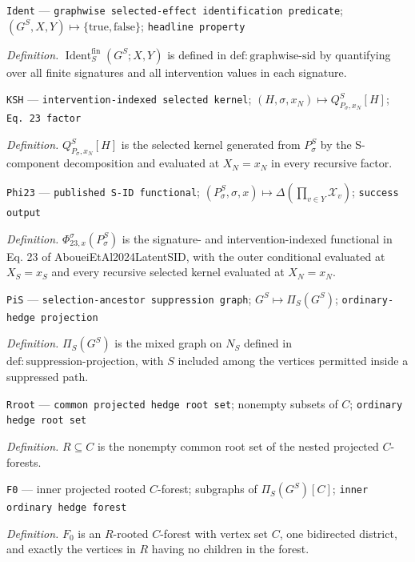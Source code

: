 \documentclass{article}
\begin{document}
\begin{itemize}
{  \item \texttt{Ident} --- \texttt{graphwise selected-\allowbreak{}effect identification predicate}; \((G^S,X,Y)\mapsto\{\mathrm{true},\mathrm{false}\}\); \texttt{headline property}
  \par\smallskip\noindent\emph{Definition.} \(\operatorname{Ident}^{\mathrm{fin}}_S(G^S;X,Y)\) is defined in \(\mathrm{def:graphwise\text{-}sid}\) by quantifying over all finite signatures and all intervention values in each signature.
  \item \texttt{KSH} --- \texttt{intervention-\allowbreak{}indexed selected kernel}; \((H,\sigma,x_N)\mapsto Q_{P_\sigma,x_N}^S[H]\); \texttt{Eq. 23 factor}
  \par\smallskip\noindent\emph{Definition.} \(Q_{P_\sigma,x_N}^S[H]\) is the selected kernel generated from \(P_\sigma^S\) by the S-component decomposition and evaluated at \(X_N=x_N\) in every recursive factor.
  \item \texttt{Phi23} --- \texttt{published S-\allowbreak{}ID functional}; \((P_\sigma^S,\sigma,x)\mapsto\Delta(\prod_{v\in Y}\mathcal X_v)\); \texttt{success output}
  \par\smallskip\noindent\emph{Definition.} \(\Phi_{23,x}^{\sigma}(P_\sigma^S)\) is the signature- and intervention-indexed functional in Eq. 23 of AboueiEtAl2024LatentSID, with the outer conditional evaluated at \(X_S=x_S\) and every recursive selected kernel evaluated at \(X_N=x_N\).
  \item \texttt{PiS} --- \texttt{selection-\allowbreak{}ancestor suppression graph}; \(G^S\mapsto\Pi_S(G^S)\); \texttt{ordinary-\allowbreak{}hedge projection}
  \par\smallskip\noindent\emph{Definition.} \(\Pi_S(G^S)\) is the mixed graph on \(N_S\) defined in \(\mathrm{def:suppression\text{-}projection}\), with \(S\) included among the vertices permitted inside a suppressed path.
  \item \texttt{Rroot} --- \texttt{common projected hedge root set}; nonempty subsets of \(C\); \texttt{ordinary hedge root set}
  \par\smallskip\noindent\emph{Definition.} \(R\subseteq C\) is the nonempty common root set of the nested projected \(C\)-forests.
  \item \texttt{F0} --- inner projected rooted \(C\)-forest; subgraphs of \(\Pi_S(G^S)[C]\); \texttt{inner ordinary hedge forest}
  \par\smallskip\noindent\emph{Definition.} \(F_0\) is an \(R\)-rooted \(C\)-forest with vertex set \(C\), one bidirected district, and exactly the vertices in \(R\) having no children in the forest.
}
\end{itemize}
\end{document}
